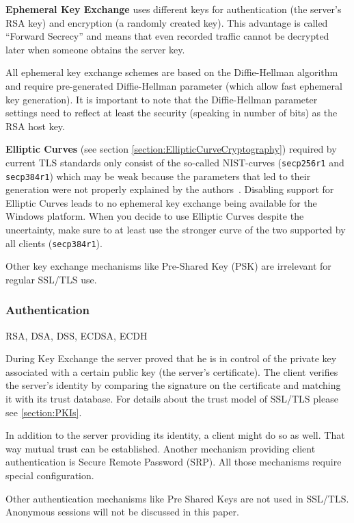 \textbf{Ephemeral Key Exchange} uses different keys for authentication (the server's RSA
key) and encryption (a randomly created key). This advantage is called ``Forward
Secrecy'' and means that even recorded traffic cannot be decrypted later when someone
obtains the server key.

All ephemeral key exchange schemes are based on the Diffie-Hellman algorithm and require
pre-generated Diffie-Hellman parameter (which allow fast ephemeral key generation). It
is important to note that the Diffie-Hellman parameter settings need to reflect at least 
the security (speaking in number of bits) as the RSA host key. 


\textbf{Elliptic Curves} (see section \ref{section:EllipticCurveCryptography})
required by current TLS standards only consist of the so-called NIST-curves
(\texttt{secp256r1} and \texttt{secp384r1}) which may be weak because the
parameters that led to their generation were not properly explained by the
authors~\cite{DJBSC}. Disabling support for Elliptic Curves leads to no
ephemeral key exchange being available for the Windows platform. When you
decide to use Elliptic Curves despite the uncertainty, make sure to at least
use the stronger curve of the two supported by all clients
(\texttt{secp384r1}).


Other key exchange mechanisms like Pre-Shared Key (PSK) are irrelevant for
regular SSL/TLS use.

\subsubsection{Authentication}

RSA, DSA, DSS, ECDSA, ECDH

During Key Exchange the server proved that he is in control of the private key
associated with a certain public key (the server's certificate). The client
verifies the server's identity by comparing the signature on the certificate
and matching it with its trust database. For details about the trust model of
SSL/TLS please see \ref{section:PKIs}.

In addition to the server providing its identity, a client might do so as well.
That way mutual trust can be established. Another mechanism providing client
authentication is Secure Remote Password (SRP). All those
mechanisms require special configuration.

Other authentication mechanisms like Pre Shared Keys are not used in SSL/TLS.
Anonymous sessions will not be discussed in this paper.

